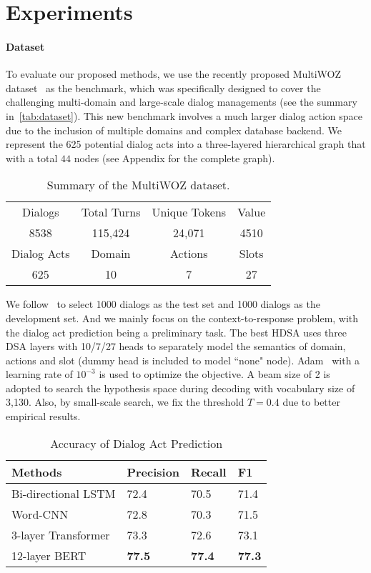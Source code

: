 \documentclass[11pt,a4paper]{article}
\begin{document}
\section{Experiments}
\label{sec:dialog-act}
\paragraph{Dataset} 
To evaluate our proposed methods, we use the recently proposed MultiWOZ dataset~\cite{DBLP:conf/emnlp/BudzianowskiWTC18} as the benchmark, which was specifically designed to cover the challenging multi-domain and large-scale dialog managements (see the summary in~\autoref{tab:dataset}). This new benchmark involves a much larger dialog action space due to the inclusion of multiple domains and complex database backend. We represent the 625 potential dialog acts into a three-layered hierarchical graph that with a total $44$ nodes (see Appendix for the complete graph).
\begin{table}[htb]
\small
\centering
\begin{tabular}{cccc} 
\toprule
Dialogs & Total Turns   & Unique Tokens  & Value  \\
8538     & 115,424  & 24,071  &  4510     \\ 
\midrule
Dialog Acts  & Domain & Actions & Slots   \\ 
625     & 10        & 7          & 27      \\
\bottomrule
\end{tabular}
\caption{Summary of the MultiWOZ dataset.}
\label{tab:dataset}
\end{table}
We follow~\citet{DBLP:conf/emnlp/BudzianowskiWTC18} to select 1000 dialogs as the test set and 1000 dialogs as the development set. And we mainly focus on the context-to-response problem, with the dialog act prediction being a preliminary task. The best HDSA uses three DSA layers with 10/7/27 heads to separately model the semantics of domain, actions and slot (dummy head is included to model ``none" node). Adam~\cite{kingma2014adam} with a learning rate of $10^{-3}$ is used to optimize the objective. A beam size of 2 is adopted to search the hypothesis space during decoding with vocabulary size of 3,130. Also, by small-scale search, we fix the threshold $T=0.4$ due to better empirical results.
\begin{table}[htb]
\centering
\small
\begin{tabular}{llll} 
\toprule
Methods            & Precision & Recall & F1  \\ 
\midrule  
Bi-directional LSTM               &     72.4   &70.5     &  71.4 \\
Word-CNN        &       72.8    & 70.3      & 71.5    \\
3-layer Transformer &   73.3        &   72.6     &  73.1   \\
12-layer BERT &     \textbf{77.5}      &    \textbf{77.4}    &    \textbf{77.3} \\
\bottomrule
\end{tabular}
\caption{Accuracy of Dialog Act Prediction}
\label{tab:predict}
\end{table}
\end{document}
